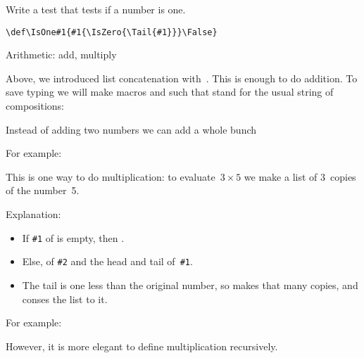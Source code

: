 \begin{594exercise}
Write a test  that tests if a number is one.
\begin{logix}
\end{logix}
\end{594exercise}
\begin{answer}
\begin{verbatim}
\def\IsOne#1{#1{\IsZero{\Tail{#1}}}\False}
\end{verbatim}
\end{answer}

 {Arithmetic: add, multiply}

Above, we introduced list concatenation with~.
This is enough to do addition. To save typing we will make macros
 and such that stand for the usual string of 
compositions:
\begin{inputwithcode}
\let\Add=\Cat
\end{inputwithcode}
\begin{logix}
\end{logix}
Instead of adding two numbers we can add a whole bunch
\begin{inputwithcode}
\def\AddTogether{\ListApply\Add\Zero}
\end{inputwithcode}
For example:
\begin{logix}
%
  {\AddTogether{\Cons\Two{\Singleton\Three}}}
%
  {\AddTogether{\Cons\Two{\Cons\Three{\Singleton\Three}}}}
\end{logix}
This is one way to do multiplication: to evaluate~$3\times5$ we make
a list of 3~copies of the number~5.
\begin{inputwithcode}
\def\Copies#1#2{#1{\ConsCopy{#2}}\Nil}
\def\ConsCopy#1#2#3{\Cons{#1}{\Copies{#3}{#1}}}
\def\Mult#1#2{\AddTogether{\Copies{#1}{#2}}}
\end{inputwithcode}
Explanation:
\begin{itemize}
\item If \verb+#1+ of  is empty, then .
\item Else,  of \verb+#2+ and the head and tail
  of~\verb+#1+.
\item The tail is one less than the original number, so 
  makes that many copies, and conses the list to it.
\end{itemize}
For example:
\begin{logix}
\end{logix}
However, it is more elegant to define multiplication recursively.
\begin{inputwithcode}
\def\MultiplyBy#1#2{%
  \IsOne{#1}{#2}{\Add{#2}{\MultiplyBy{\SubOne{#1}}{#2}}}}
\end{inputwithcode}
\begin{logix}
\end{logix}

